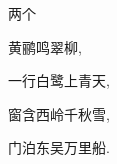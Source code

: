 \documentclass[nofonts]{ctexart}
\begin{document}
\begin{minipage}[c][2.5cm][t]{2em}两个\end{minipage}\quad 
\begin{minipage}[c][2.5cm][c]{3em}黄鹂鸣翠柳,\end{minipage}\quad 
\begin{minipage}[c][2.5cm][b]{3em}一行白鹭上青天,\end{minipage}\quad 
\begin{minipage}[c][2.5cm][s]{4em}
	\setlength\parskip{0pt plus 1pt} %
	窗含西岭千秋雪, \par 
	门泊东吴万里船.
\end{minipage}
\end{document}
